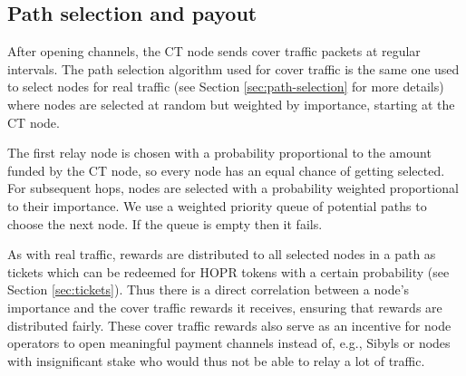 \subsection{Path selection and payout}
\label{sec:ct:pathselection}

After opening channels, the CT node sends cover traffic packets at regular intervals. The path selection algorithm used for cover traffic is the same one used to select nodes for real traffic (see Section \ref{sec:path-selection} for more details) where nodes are selected at random but weighted by importance, starting at the CT node.

The first relay node is chosen with a probability proportional to the amount funded by the CT node, so every node has an equal chance of getting selected. For subsequent hops, nodes are selected with a probability weighted proportional to their importance. We use a weighted priority queue of potential paths to choose the next node. If the queue is empty then it fails.

As with real traffic, rewards are distributed to all selected nodes in a path as tickets which can be redeemed for HOPR tokens with a certain probability (see Section \ref{sec:tickets}). Thus there is a direct correlation between a node's importance and the cover traffic rewards it receives, ensuring that rewards are distributed fairly. These cover traffic rewards also serve as an incentive for node operators to open meaningful payment channels instead of, e.g., Sibyls or nodes with insignificant stake who would thus not be able to relay a lot of traffic.
